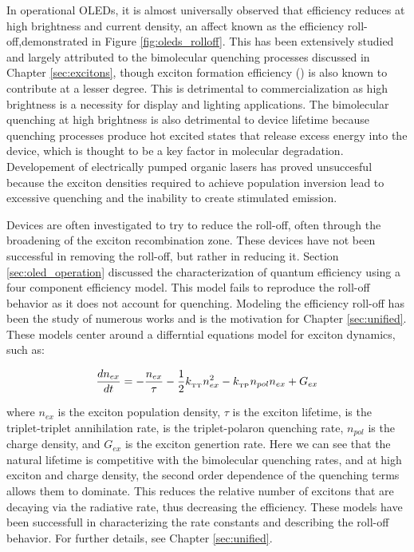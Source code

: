 \documentclass[../thesis.tex]{subfiles}
\begin{document}
In operational OLEDs, it is almost universally observed that efficiency reduces at high brightness and current density, an affect known as the efficiency roll-off,demonstrated in Figure \ref{fig:oleds_rolloff}.\supercite{Erickson2014,Song2011,Wehrmeister2015,Son2008,Murawski2013,Giebink2008c,Song2010,Xiang2016,Coehoorn2015,Reineke2009,Mezyk2005,Baldo2000a,Reineke2007,Kohler2009,Hershey2016,Erickson2013a}
This has been extensively studied and largely attributed to the bimolecular quenching processes discussed in Chapter \ref{sec:excitons}, though exciton formation efficiency (\ef) is also known to contribute at a lesser degree.
This is detrimental to commercialization as high brightness is a necessity for display and lighting applications.
The bimolecular quenching at high brightness is also detrimental to device lifetime because quenching processes produce hot excited states that release excess energy into the device, which is thought to be a key factor in molecular degradation.\supercite{Giebink2008a,Coburn2017,Lee2017}
Developement of electrically pumped organic lasers has proved unsuccesful because the exciton densities required to achieve population inversion lead to excessive quenching and the inability to create stimulated emission.\supercite{Baldo2002,Baldo1998a,Holmes2007,Takenobu2008,Samuel2009,Kasemann2011}

Devices are often investigated to try to reduce the roll-off, often through the broadening of the exciton recombination zone.\supercite{Wang2015,Murawski2014,Inoue2016,Soofi2017,Chopra2010,Reineke2007a,Lee2009b,Su2008a,Zang2008}
These devices have not been successful in removing the roll-off, but rather in reducing it.
Section \ref{sec:oled_operation} discussed the characterization of quantum efficiency using a four component efficiency model.  
This model fails to reproduce the roll-off behavior as it does not account for quenching.
Modeling the efficiency roll-off has been the study of numerous works and is the motivation for Chapter \ref{sec:unified}.\supercite{Reineke2007,Erickson2014,Hershey2016,Murawski2013}
These models center around a differntial equations model for exciton dynamics, such as:

\begin{equation}
\frac{dn_{ex}}{dt} = - \frac{n_{ex}}{\tau}-\frac{1}{2}k_{_\text{\tiny TT}} n_{ex}^2-k_{_\text{\tiny TP}} n_{pol}n_{ex}+G_{ex}
\label{eqn:oleds_exciton_rate}
\end{equation}

where $n_{ex}$ is the exciton population density, $\tau$ is the exciton lifetime, \ktt is the triplet-triplet annihilation rate, \ktp is the triplet-polaron quenching rate, $n_{pol}$ is the charge density, and $G_{ex}$ is the exciton genertion rate.
Here we can see that the natural lifetime is competitive with the bimolecular quenching rates, and at high exciton and charge density, the second order dependence of the quenching terms allows them to dominate.
This reduces the relative number of excitons that are decaying via the radiative rate, thus decreasing the efficiency.
These models have been successfull in characterizing the rate constants and describing the roll-off behavior.
For further details, see Chapter \ref{sec:unified}.
\end{document}
